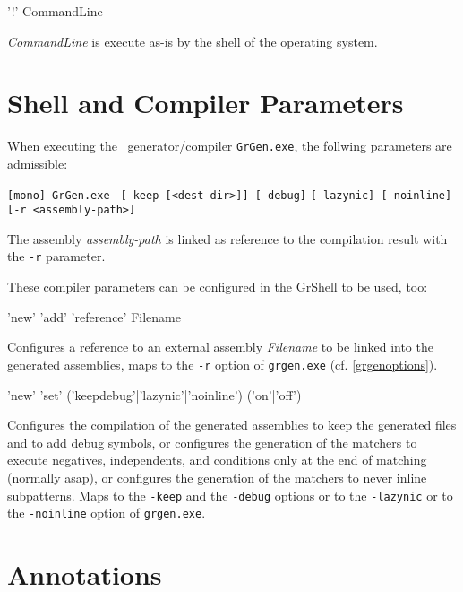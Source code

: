\begin{rail}
  '!' CommandLine
\end{rail}
\emph{CommandLine} is execute as-is by the shell of the operating system.

\section{Shell and Compiler Parameters}

\noindent When executing the \GrG\ generator/compiler \texttt{GrGen.exe}, the follwing parameters are admissible:

\noindent \texttt{[mono] GrGen.exe } \texttt{[-keep [<dest-dir>]] [-debug]} \texttt{[-lazynic] [-noinline]} \texttt{[-r <assembly-path>]}

The assembly \emph{assembly-path} is linked as reference to the compilation result with the \texttt{-r} parameter.

These compiler parameters can be configured in the GrShell to be used, too:
\begin{rail}
  'new' 'add' 'reference' Filename
\end{rail}
Configures a reference to an external assembly \emph{Filename} to be linked into the generated assemblies, maps to the \texttt{-r} option of \texttt{grgen.exe} (cf. \ref{grgenoptions}).

\begin{rail}
  'new' 'set' ('keepdebug'|'lazynic'|'noinline') ('on'|'off')
\end{rail}
Configures the compilation of the generated assemblies to keep the generated files and to add debug symbols,
or configures the generation of the matchers to execute negatives, independents, and conditions only at the end of matching (normally asap),
or configures the generation of the matchers to never inline subpatterns.
Maps to the \texttt{-keep} and the \texttt{-debug} options or to the \texttt{-lazynic} or to the \texttt{-noinline} option of \texttt{grgen.exe}.


\section{Annotations}
\label{annotations}

